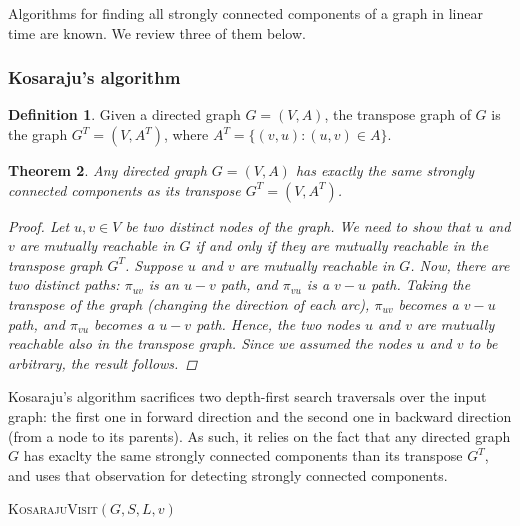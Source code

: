 \documentclass[english]{tktltiki2}
\newtheorem{mythm}{Theorem}[section]
\theoremstyle{definition}
\newtheorem{mydef}[mythm]{Definition}
\theoremstyle{remark}
\begin{document}
Algorithms for finding all strongly connected components of a graph in linear time are known. We review three of them below.

\subsubsection{Kosaraju's algorithm}

\begin{mydef}
Given a directed graph $G = (V, A)$, the transpose graph of $G$ is the graph $G^T = (V, A^T)$, where $A^T = \{ (v, u) \colon (u, v) \in A \}$.
\end{mydef}

\begin{mythm}
Any directed graph $G = (V,A)$ has exactly the same strongly connected components as its transpose $G^T = (V, A^T)$.

\begin{proof}
Let $u, v \in V$ be two distinct nodes of the graph. We need to show that $u$ and $v$ are mutually reachable in $G$ if and only if they are mutually reachable in the transpose graph $G^T$. Suppose $u$ and $v$ are mutually reachable in $G$. Now, there are two distinct paths: $\pi_{uv}$ is an $u-v$ path, and $\pi_{vu}$ is a $v-u$ path. Taking the transpose of the graph (changing the direction of each arc), $\pi_{uv}$ becomes a $v-u$ path, and $\pi_{vu}$ becomes a $u-v$ path. Hence, the two nodes $u$ and $v$ are mutually reachable also in the transpose graph. Since we assumed the nodes $u$ and $v$ to be arbitrary, the result follows.
\end{proof}
\end{mythm}

Kosaraju's algorithm sacrifices two depth-first search traversals over the input graph: the first one in forward direction and the second one in backward direction (from a node to its parents). As such, it relies on the fact that any directed graph $G$ has exaclty the same strongly connected components than its transpose $G^T$, and uses that observation for detecting strongly connected components.

\begin{algorithm}
\caption{\textsc{KosarajuVisit}$(G, S, L, v)$}
\label{alg:kosaraju_visit}
\end{algorithm}
\end{document}
